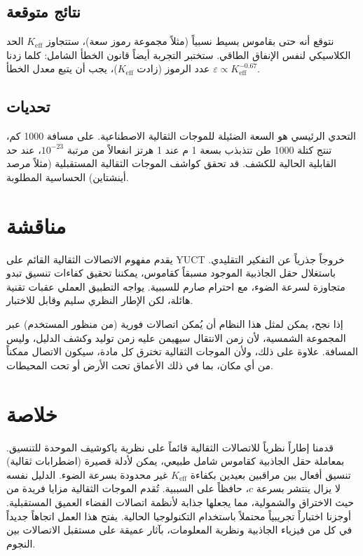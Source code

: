 \documentclass[11pt,a4paper]{article}
\newcommand{\Keff}{K_{\mathrm{eff}}}
\newcommand{\eps}{\varepsilon}
\begin{document}
	\subsection{نتائج متوقعة}
	
	نتوقع أنه حتى بقاموس بسيط نسبياً (مثلاً مجموعة رموز سعة)، ستتجاوز \(\Keff\) الحد الكلاسيكي لنفس الإنفاق الطاقي. ستختبر التجربة أيضاً قانون الخطأ الشامل: كلما زدنا عدد الرموز (زادت \(\Keff\))، يجب أن يتبع معدل الخطأ \(\eps \propto \Keff^{-0.67}\).
	
	\subsection{تحديات}
	
	التحدي الرئيسي هو السعة الضئيلة للموجات الثقالية الاصطناعية. على مسافة 1000 كم، تنتج كتلة 1000 طن تتذبذب بسعة 1 م عند 1 هرتز انفعالاً من مرتبة \(10^{-23}\)، عند حد القابلية الحالية للكشف. قد تحقق كواشف الموجات الثقالية المستقبلية (مثلاً مرصد أينشتاين) الحساسية المطلوبة.
	
	\section{مناقشة}
	\label{sec:discussion}
	
	يقدم مفهوم الاتصالات الثقالية القائم على YUCT خروجاً جذرياً عن التفكير التقليدي. باستغلال حقل الجاذبية الموجود مسبقاً كقاموس، يمكننا تحقيق كفاءات تنسيق تبدو متجاوزة لسرعة الضوء، مع احترام صارم للسببية. يواجه التطبيق العملي عقبات تقنية هائلة، لكن الإطار النظري سليم وقابل للاختبار.
	
	إذا نجح، يمكن لمثل هذا النظام أن يُمكن اتصالات فورية (من منظور المستخدم) عبر المجموعة الشمسية، لأن زمن الانتقال سيهيمن عليه زمن توليد وكشف الدليل، وليس المسافة. علاوة على ذلك، ولأن الموجات الثقالية تخترق كل مادة، سيكون الاتصال ممكناً من أي مكان، بما في ذلك الأعماق تحت الأرض أو تحت المحيطات.
	
	\section{خلاصة}
	\label{sec:conclusion}
	
	قدمنا إطاراً نظرياً للاتصالات الثقالية قائماً على نظرية ياكوشيف الموحدة للتنسيق. بمعاملة حقل الجاذبية كقاموس شامل طبيعي، يمكن لأدلة قصيرة (اضطرابات ثقالية) تنسيق أفعال بين مراقبين بعيدين بكفاءة \(\Keff\) غير محدودة بسرعة الضوء. الدليل نفسه لا يزال ينتشر بسرعة \(c\)، حافظاً على السببية. تُقدم الموجات الثقالية مزايا فريدة من حيث الاختراق والشمولية، مما يجعلها جذابة لأنظمة اتصالات الفضاء العميق المستقبلية. أوجزنا اختباراً تجريبياً محتملاً باستخدام التكنولوجيا الحالية. يفتح هذا العمل اتجاهاً جديداً في كل من فيزياء الجاذبية ونظرية المعلومات، بآثار عميقة على مستقبل الاتصالات بين النجوم.
	
\end{document}
